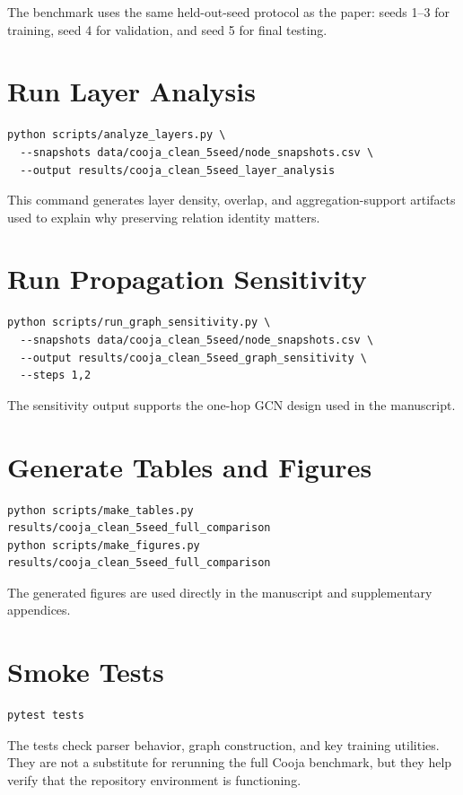 \documentclass[10pt]{article}
\begin{document}
The benchmark uses the same held-out-seed protocol as the paper: seeds 1--3 for training, seed 4 for validation, and seed 5 for final testing.

\section{Run Layer Analysis}
\begin{lstlisting}
python scripts/analyze_layers.py \
  --snapshots data/cooja_clean_5seed/node_snapshots.csv \
  --output results/cooja_clean_5seed_layer_analysis
\end{lstlisting}

This command generates layer density, overlap, and aggregation-support artifacts used to explain why preserving relation identity matters.

\section{Run Propagation Sensitivity}
\begin{lstlisting}
python scripts/run_graph_sensitivity.py \
  --snapshots data/cooja_clean_5seed/node_snapshots.csv \
  --output results/cooja_clean_5seed_graph_sensitivity \
  --steps 1,2
\end{lstlisting}

The sensitivity output supports the one-hop GCN design used in the manuscript.

\section{Generate Tables and Figures}
\begin{lstlisting}
python scripts/make_tables.py results/cooja_clean_5seed_full_comparison
python scripts/make_figures.py results/cooja_clean_5seed_full_comparison
\end{lstlisting}

The generated figures are used directly in the manuscript and supplementary appendices.

\section{Smoke Tests}
\begin{lstlisting}
pytest tests
\end{lstlisting}

The tests check parser behavior, graph construction, and key training utilities. They are not a substitute for rerunning the full Cooja benchmark, but they help verify that the repository environment is functioning.
\end{document}
